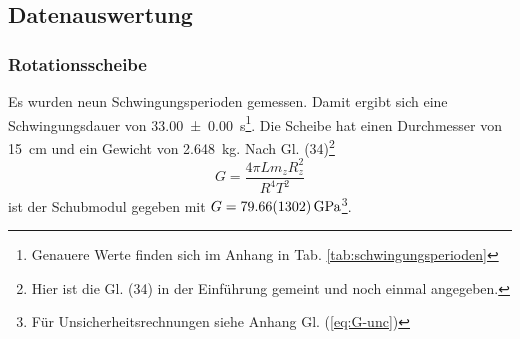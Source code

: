 \subsection{Datenauswertung}

\subsubsection*{Rotationsscheibe}
Es wurden neun Schwingungsperioden gemessen.
Damit ergibt sich eine Schwingungsdauer von \SI{33,00 +- 0,00}{\second}\footnote{Genauere Werte finden sich im Anhang in Tab. \ref{tab:schwingungsperioden}}.
Die Scheibe hat einen Durchmesser von \SI{15}{\centi\meter} und ein Gewicht von \SI{2,648}{\kilogram}.
Nach Gl. (34)\footnote{Hier ist die Gl. (34) in der Einführung gemeint und noch einmal angegeben.}
\begin{equation}
	G = \frac{4\pi L m_z R_z^2}{R^4 T^2}
\end{equation}
ist der Schubmodul gegeben mit $G = \SI{79,66+-13,02}{\giga\pascal}$\footnote{Für Unsicherheitsrechnungen siehe Anhang Gl. (\ref{eq:G-unc})}.

